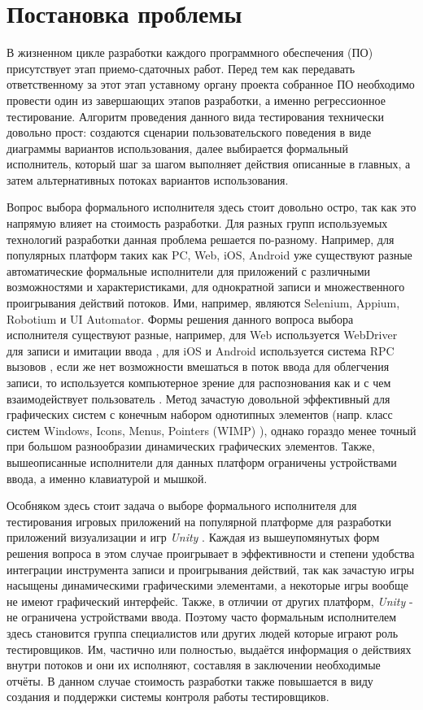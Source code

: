 \Introduction
\section*{Постановка проблемы}
В жизненном цикле разработки каждого программного обеспечения (ПО) присутствует этап приемо-сдаточных работ. Перед тем как передавать ответственному за этот этап уставному органу проекта собранное ПО необходимо провести один из завершающих этапов разработки, а именно регрессионное тестирование. Алгоритм проведения данного вида тестирования технически довольно прост: создаются сценарии пользовательского поведения в виде диаграммы вариантов использования, далее выбирается формальный исполнитель, который шаг за шагом выполняет действия описанные в главных, а затем альтернативных потоках вариантов использования. 

Вопрос выбора формального исполнителя здесь стоит довольно остро, так как это напрямую влияет на стоимость разработки. Для разных групп используемых технологий разработки данная проблема решается по-разному. Например, для популярных платформ таких как PC, Web, iOS, Android уже существуют разные автоматические формальные исполнители для приложений с различными возможностями и характеристиками, для однократной записи и множественного проигрывания действий потоков. Ими, например, являются Selenium, Appium, Robotium и UI Automator. Формы решения данного вопроса выбора исполнителя существуют разные, например, для Web используется WebDriver для записи и имитации ввода \cite{selenium}, для iOS и Android используется система RPC вызовов \cite{rpc_testing}, если же нет возможности вмешаться в поток ввода для облегчения записи, то используется компьютерное зрение для распознования как и с чем взаимодействует пользователь \cite{appium_opencv}. Метод зачастую довольной эффективный для графических систем с конечным набором однотипных элементов (напр. класс систем Windows, Icons, Menus, Pointers (WIMP) \cite{wimp}), однако гораздо менее точный при большом разнообразии динамических графических элементов. Также, вышеописанные исполнители для данных платформ ограничены устройствами ввода, а именно клавиатурой и мышкой.

Особняком здесь стоит задача о выборе формального исполнителя для тестирования игровых приложений на популярной платформе для разработки приложений визуализации и игр \textit{Unity} \cite{habr}. Каждая из вышеупомянутых форм решения вопроса в этом случае проигрывает в эффективности и степени удобства интеграции инструмента записи и проигрывания действий, так как зачастую игры насыщены динамическими графическими элементами, а некоторые игры вообще не имеют графический интерфейс. Также, в отличии от других платформ, \textit{Unity} - не ограничена устройствами ввода. Поэтому часто формальным исполнителем здесь становится группа специалистов или других людей которые играют роль тестировщиков. Им, частично или полностью, выдаётся информация о действиях внутри потоков и они их исполняют, составляя в заключении необходимые отчёты. В данном случае стоимость разработки также повышается в виду создания и поддержки системы контроля работы тестировщиков.

